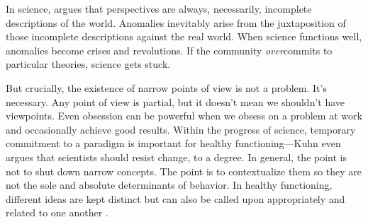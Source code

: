 \documentclass[12pt]{article}
\begin{document}
In science, \cite{kuhn1970structure} argues that perspectives are always, necessarily, incomplete descriptions of the world. Anomalies inevitably arise from the juxtaposition of those incomplete descriptions against the real world. When science functions well, anomalies become crises and revolutions. If the community \textit{over}commits to particular theories, science gets stuck.

But crucially, the existence of narrow points of view is not a problem. It's necessary. Any point of view is partial, but it doesn't mean we shouldn't have viewpoints. Even obsession can be powerful when we obsess on a problem at work and occasionally achieve good results. Within the progress of science, temporary commitment to a paradigm is important for healthy functioning---Kuhn even argues that scientists should resist change, to a degree. In general, the point is not to shut down narrow concepts. The point is to contextualize them so they are not the sole and absolute determinants of behavior. In healthy functioning, different ideas are kept distinct but can also be called upon appropriately and related to one another \citep{hatano1984two, herzog2014harnessing, gigerenzer2011heuristic, spiro1988cognitive, suedfeld1992conceptual}. 




\end{document}
